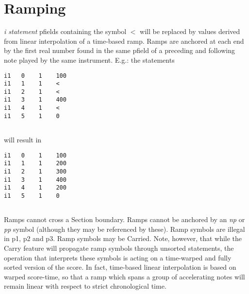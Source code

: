 \begin{comment}
\documentclass[10pt]{article}
\usepackage{fullpage, graphicx, url}
\setlength{\parskip}{1ex}
\setlength{\parindent}{0ex}
\title{Ramping}



\begin{tabular}{ccc}
The Alternative Csound Reference Manual & & \\
Previous &The Standard Numeric Score &Next

\end{tabular}

\end{comment}
\section{Ramping}


 \emph{i statement}
 pfields containing the symbol \emph{$<$}
 will be replaced by values derived from linear interpolation of a time-based ramp. Ramps are anchored at each end by the first real number found in the same pfield of a preceding and following note played by the same instrument. E.g.: the statements 


 
\begin{lstlisting}
i1   0    1    100
i1   1    1    <
i1   2    1    <
i1   3    1    400
i1   4    1    <
i1   5    1    0
      
\end{lstlisting}


 
 will result in 

 
\begin{lstlisting}
i1   0    1    100 
i1   1    1    200
i1   2    1    300
i1   3    1    400
i1   4    1    200
i1   5    1    0
      
\end{lstlisting}


 


  Ramps cannot cross a Section boundary. Ramps cannot be anchored by an \emph{np}
 or \emph{pp}
 symbol (although they may be referenced by these). Ramp symbols are illegal in p1, p2 and p3. Ramp symbols may be Carried. Note, however, that while the Carry feature will propagate ramp symbols through unsorted statements, the operation that interprets these symbols is acting on a time-warped and fully sorted version of the score. In fact, time-based linear interpolation is based on warped score-time, so that a ramp which spans a group of accelerating notes will remain linear with respect to strict chronological time. 



